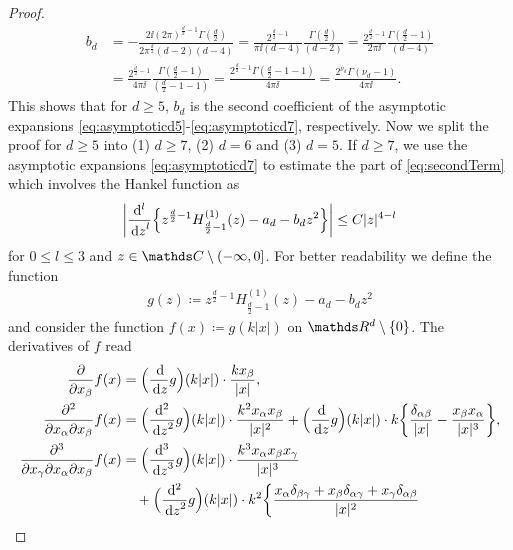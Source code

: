 \begin{proof}
    \begin{align*}
      b_d &= -\frac{2\ii (2\pi)^{\frac{d}{2} - 1} \Gamma(\frac{d}{2})}{2\pi^{\frac{d}{2}} (d - 2)(d - 4)}
 = \frac{2^{\frac{d}{2} - 1} }{\pi \ii (d - 4)} \frac{\Gamma(\frac{d}{2})}{(d - 2)} 
 = \frac{2^{\frac{d}{2} - 1} }{2\pi \ii } \frac{\Gamma(\frac{d}{2} - 1)}{(d - 4)} \\
      &= \frac{2^{\frac{d}{2} - 1}}{4 \pi \ii } \frac{\Gamma(\frac{d}{2} - 1)}{(\frac{d}{2} - 1 - 1)}
      = \frac{2^{\frac{d}{2} - 1} \Gamma(\frac{d}{2} - 1 - 1)}{4 \pi \ii } = \frac{2^{\nu_d} \Gamma(\nu_d - 1)}{4 \pi \ii}.
\end{align*}
This shows that for $d \geq 5$, $b_d$ is the second coefficient of the asymptotic expansions \eqref{eq:asymptoticd5}-\eqref{eq:asymptoticd7}, respectively. 
Now we split the proof for $d \geq 5$ into (1) $d \geq 7$, (2) $d = 6$ and (3) $d = 5$.
If $d \geq 7$, we use the asymptotic expansions \eqref{eq:asymptoticd7} to estimate the part of \eqref{eq:secondTerm} which involves the Hankel function as
\begin{align}
  \label{eq:estimateDerivativesd7}
  \bigg| \frac{\mathrm{d}^l}{\, {\operatorname{d}\!{z}}^l} \Big\{ z^{\frac{d}{2} - 1} H_{\frac{d}{2} - 1}^{(1)}(z) - a_d - b_d z^2 \Big\} \bigg| \leq C |z|^{4 - l}
\end{align}
for $0 \leq l \leq 3$ and $z \in \C \setminus (-\infty, 0]$.
For better readability we define the function
\begin{align*}
  g(z) \coloneqq z^{\frac{d}{2} - 1} H_{\frac{d}{2} - 1}^{(1)}(z) - a_d - b_d z^2
\end{align*}
and consider the function $f(x) \coloneqq g(k |x|)$ on $\R^d \setminus \{0\}$.
The derivatives of $f$ read
\begin{align*}
  \frac{\partial}{\partial x_\beta} f(x)
  &= \Big(\frac{\d{}}{\d z} g\Big)(k|x|) \cdot \frac{k x_\beta}{|x|}, \\
  \frac{\partial^2}{\partial x_\alpha \partial x_\beta} f(x)
  &= \Big(\frac{\mathrm{d}^2}{\d z^2} g\Big)(k|x|) \cdot \frac{k^2 x_\alpha x_\beta}{|x|^2} 
  + \Big(\frac{\d{}}{\d z} g\Big)(k |x|) \cdot k \bigg\{ \frac{\delta_{\alpha\beta}}{|x|} - \frac{x_\beta x_\alpha}{|x|^3} \bigg\}, \\
  \frac{\partial^3}{\partial x_\gamma \partial x_\alpha \partial x_\beta} f(x)
  &= \Big(\frac{\mathrm{d}^3}{\d z^3}g\Big)(k |x|) \cdot \frac{k^3 x_\alpha x_\beta x_\gamma}{|x|^3} \\
  &\quad + \Big(\frac{\mathrm{d}^2}{\d z^2}g\Big)(k|x|) 
  \cdot k^2 \bigg\{ \frac{x_\alpha \delta_{\beta\gamma} + x_\beta \delta_{\alpha\gamma} + x_\gamma \delta_{\alpha\beta}}{|x|^2} 

\end{align*}
\end{proof}
